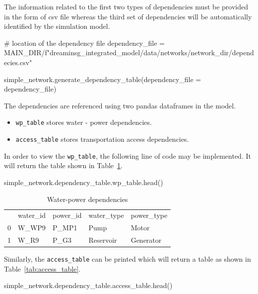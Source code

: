 \documentclass[letterpaper,12pt,english]{sphinxmanual}
\begin{document}
The information related to the first two types of dependencies must be provided in the form of  csv file whereas the third set of dependencies will be automatically identified by the simulation model. 

\begin{sphinxVerbatim}[commandchars=\\\{\}]
# location of the dependency file
dependency_file = MAIN_DIR/f"dreaminsg_integrated_model/data/networks/{network_dir}/dependecies.csv"

simple_network.generate_dependency_table(dependency_file = dependency_file)
\end{sphinxVerbatim}

The dependencies are referenced using two pandas dataframes in the model.
\begin{itemize}[noitemsep]
	\item {\tt wp_table} stores water - power dependencies.
	\item {\tt access_table} stores transportation access dependencies.
\end{itemize}

In order to view the {\tt wp_table}, the following line of code may be implemented. It will return the table shown in Table~\ref{tab:wp_table}.
\begin{sphinxVerbatim}[commandchars=\\\{\}]
simple_network.dependency_table.wp_table.head()
\end{sphinxVerbatim}

\begin{table}[h!]
	\caption{Water-power dependencies}
	\centering
	\begin{tabular}{lllll}
		\rowcolor[HTML]{C0C0C0} 
		& water\_id & power\_id & water\_type & power\_type \\
		0 & W\_WP9    & P\_MP1    & Pump        & Motor       \\
		\rowcolor[HTML]{EFEFEF} 
		1 & W\_R9     & P\_G3     & Reservoir   & Generator  
	\end{tabular}
	\label{tab:wp_table}
\end{table}

Similarly, the {\tt access_table} can be printed which will return a table as shown in Table~\ref{tab:access_table}.

\begin{sphinxVerbatim}[commandchars=\\\{\}]
simple_network.dependency_table.access_table.head()
\end{sphinxVerbatim}
\end{document}
